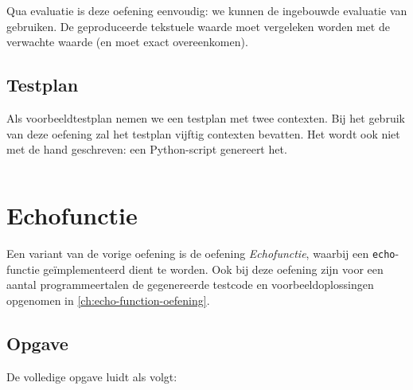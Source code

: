 Qua evaluatie is deze oefening eenvoudig: we kunnen de ingebouwde evaluatie van \tested{} gebruiken.
De geproduceerde tekstuele waarde moet vergeleken worden met de verwachte waarde (en moet exact overeenkomen).

\subsection{Testplan}\label{subsec:oefening-echo-testplan}

Als voorbeeldtestplan nemen we een testplan met twee contexten.
Bij het gebruik van deze oefening zal het testplan vijftig contexten bevatten.
Het wordt ook niet met de hand geschreven: een Python-script genereert het.

\inputminted{json}{sources/echo/two.tson}

\section{Echofunctie}\label{sec:oefening-echofunctie}

Een variant van de vorige oefening is de oefening \emph{Echofunctie}, waarbij een \texttt{echo}-functie geïmplementeerd dient te worden.
Ook bij deze oefening zijn voor een aantal programmeertalen de gegenereerde testcode en voorbeeldoplossingen opgenomen in \cref{ch:echo-function-oefening}.

\subsection{Opgave}\label{subsec:oefening-echofunctie-opgave}

De volledige opgave luidt als volgt:

\begin{quote}
\end{quote}

